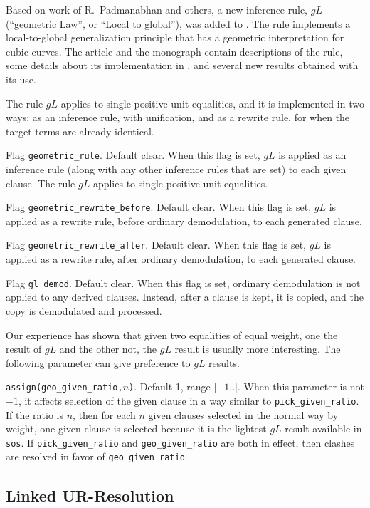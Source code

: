 \documentclass[11pt]{article}
\begin{document}
Based on work of R.~Padmanabhan and others, a new inference rule, $gL$
(``geometric Law'', or ``Local to global''), was added to \otter.  The rule
implements a local-to-global generalization principle that has a
geometric interpretation for cubic curves.  The article \cite{gl}
and the monograph \cite{wm-rp:monograph}
contain descriptions of the rule, some details about its
implementation in \otter, and several new results obtained with its use.

The rule $gL$ applies to single positive unit equalities, and it
is implemented in two ways: as an inference rule, with unification,
and as a rewrite rule, for when the target terms are already identical.

Flag \noindent \verb:geometric_rule:.  Default clear.  When this flag
is set, $gL$ is applied as an inference rule (along with any other
inference rules that are set) to each given clause.  The rule $gL$
applies to single positive unit equalities.

Flag \noindent \verb:geometric_rewrite_before:.  Default clear.  When this flag
is set, $gL$ is applied as a rewrite rule, before ordinary demodulation,
to each generated clause.

Flag \noindent \verb:geometric_rewrite_after:.  Default clear.  When this flag
is set, $gL$ is applied as a rewrite rule, after ordinary demodulation,
to each generated clause.

Flag \noindent \verb:gl_demod:.  Default clear.  When this flag
is set, ordinary demodulation is not applied to any derived clauses.
Instead, after a clause is kept, it is copied, and the copy
is demodulated and processed.

Our experience has shown that given two equalities of equal weight,
one the result of $gL$ and the other not, the $gL$ result is usually
more interesting.  The following parameter can give preference to
$gL$ results.

\noindent \verb:assign(geo_given_ratio,:$n$\verb:):.  Default 1, range [$-1$..\maxint ].
When this parameter is not $-1$, it affects selection of the given
clause in a way similar to
\verb:pick_given_ratio:.  If the ratio is $n$, then
for each $n$ given clauses selected in the normal way by weight,
one given clause is selected because it is the lightest $gL$ result
available in \verb:sos:.  If \verb:pick_given_ratio: and
\verb:geo_given_ratio: are both in effect, then clashes are resolved
in favor of \verb:geo_given_ratio:.

\subsection{Linked UR-Resolution}
\end{document}
